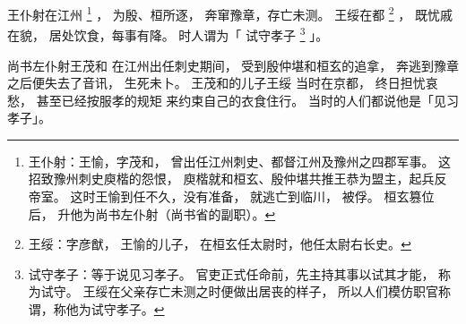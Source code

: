 
\switchcolumn*[\section{}]

王仆射在江州%
\footnote{%
    王仆射：王愉，字茂和，
            曾出任江州刺史、都督江州及豫州之四郡军事。
            这招致豫州刺史庾楷的怨恨，
            庾楷就和桓玄、殷仲堪共推王恭为盟主，起兵反帝室。
            这时王愉到任不久，没有准备，
            就逃亡到临川，
            被俘。
            桓玄篡位后，
            升他为尚书左仆射（尚书省的副职）。
}%
，
为殷、桓所逐，
奔窜豫章，存亡未测。
王绥在都%
\footnote{%
    王绥：字彦猷，
          王愉的儿子，
          在桓玄任太尉时，他任太尉右长史。
}%
，
既忧戚在貌，
居处饮食，每事有降。
时人谓为「
    试守孝子%
    \footnote{%
        试守孝子：等于说见习孝子。
                  官吏正式任命前，先主持其事以试其才能，
                  称为试守。
                  王绥在父亲存亡未测之时便做出居丧的样子，
                  所以人们模仿职官称谓，称他为试守孝子。
    }%
」。

\switchcolumn

尚书左仆射王茂和
在江州出任刺史期间，
受到殷仲堪和桓玄的追拿，
奔逃到豫章之后便失去了音讯，
生死未卜。
王茂和的儿子王绥
当时在京都，
终日担忧哀愁，
甚至已经按服孝的规矩
来约束自己的衣食住行。
当时的人们都说他是「见习孝子」。


